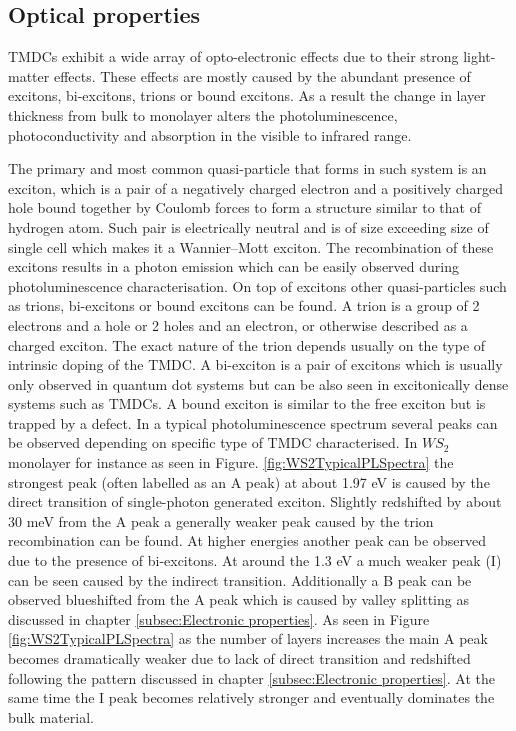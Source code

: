 	
\subsection{Optical properties}
\label{subsec:Optical properties}

TMDCs exhibit a wide array of opto-electronic effects due to their strong light-matter effects. These effects are mostly caused by the abundant presence of excitons, bi-excitons, trions or bound excitons. As a result the change in layer thickness from bulk to monolayer alters the photoluminescence, photoconductivity and absorption in the visible to infrared range.
		
The primary and most common quasi-particle that forms in such system is an exciton, which is a pair of a negatively charged electron and a positively charged hole bound together by Coulomb forces to form a structure similar to that of hydrogen atom. Such pair is electrically neutral and is of size exceeding size of single cell which makes it a Wannier–Mott exciton. The recombination of these excitons results in a photon emission which can be easily observed during photoluminescence characterisation. On top of excitons other quasi-particles such as trions, bi-excitons or bound excitons can be found. A trion is a group of 2 electrons and a hole or 2 holes and an electron, or otherwise described as a charged exciton. The exact nature of the trion depends usually on the type of intrinsic doping of the TMDC. A bi-exciton is a pair of excitons which is usually only observed in quantum dot systems but can be also seen in excitonically dense systems such as TMDCs. A bound exciton is similar to the free exciton but is trapped by a defect. In a typical photoluminescence spectrum several peaks can be observed depending on specific type of TMDC characterised. In $WS_2$ monolayer for instance as seen in Figure. \ref{fig:WS2TypicalPLSpectra} the strongest peak (often labelled as an A peak) at about 1.97 eV is caused by the direct transition of single-photon generated exciton. Slightly redshifted by about 30 meV from the A peak a generally weaker peak caused by the trion recombination can be found. At higher energies another peak can be observed due to the presence of bi-excitons. At around the 1.3 eV a much weaker peak (I) can be seen caused by the indirect transition. Additionally a B peak can be observed blueshifted from the A peak which is caused by valley splitting as discussed in chapter \ref{subsec:Electronic properties}. As seen in Figure \ref{fig:WS2TypicalPLSpectra} as the number of layers increases the main A peak becomes dramatically weaker due to lack of direct transition and redshifted following the pattern discussed in chapter \ref{subsec:Electronic properties}. At the same time the I peak becomes relatively stronger and eventually dominates the bulk material.
		
